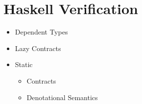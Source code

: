 \section{Haskell Verification}

\begin{itemize}
\item Dependent Types\cite{Weirich12, EisenbergW12, YorgeyWCJVM12}

\item Lazy Contracts \cite{ChitilMR03, ChitilH06, Chitil07, Chitil11, Chitil12}

\item Static 
\begin{itemize}
\item Contracts \cite{XuJC09}
\item Denotational Semantics \cite{VytiniotisJCR13}
\end{itemize}
\end{itemize}
